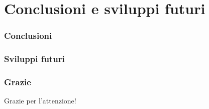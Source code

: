\documentclass{beamer}
\begin{document}
\section{Conclusioni e sviluppi futuri}

\begin{frame}
\frametitle{Conclusioni}
\end{frame}

\begin{frame}
\frametitle{Sviluppi futuri}
\end{frame}

\begin{frame}
\frametitle{Grazie}
\Huge{\centerline{Grazie per l'attenzione!}}
\end{frame}
\end{document}
